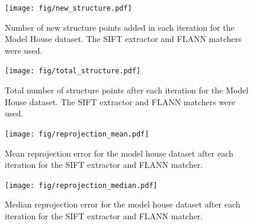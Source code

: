\begin{figure}[!htbp]
	\begin{center}
		\texttt{[image: fig/new\_structure.pdf]}
	\end{center}
	\caption{Number of new structure points added in each iteration for the Model House dataset. The SIFT extractor and FLANN matchers were used.}
	\label{fig:new_points}
\end{figure} 
\begin{figure}[!htbp]
	\begin{center}
		\texttt{[image: fig/total\_structure.pdf]}
	\end{center}
	\caption{Total number of structure points after each iteration for the Model House dataset. The SIFT extractor and FLANN matchers were used.}
	\label{fig:total_points}
\end{figure} 
\begin{figure}[!htbp]
	\begin{center}
		\texttt{[image: fig/reprojection\_mean.pdf]}
	\end{center}
	\caption{Mean reprojection error for the model house dataset after each iteration for the SIFT extractor and FLANN matcher.}
	\label{fig:reprojection_mean}
\end{figure} 
\begin{figure}[!htbp]
	\begin{center}
		\texttt{[image: fig/reprojection\_median.pdf]}
	\end{center}
	\caption{Median reprojection error for the model house dataset after each iteration for the SIFT extractor and FLANN matcher.}
	\label{fig:reprojection_mean}
\end{figure} 

